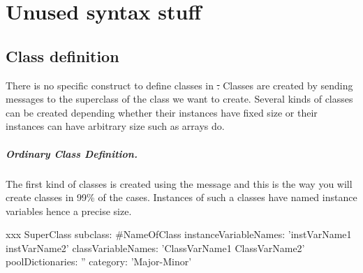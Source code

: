 \documentclass[a4paper,10pt,twoside]{book}
\begin{document}
	\renewcommand{\nnbb}[2]{} %
	\sloppy
\fi
\chapter{Unused syntax stuff}



\section{Class definition}


There is no specific construct to define classes in \st. Classes are created by sending messages to the
superclass of the class we want to create.  Several kinds of classes can be created depending whether their
instances have fixed size  or their instances can have arbitrary size such as arrays do.

\paragraph{Ordinary Class Definition.} The first kind of classes is created using the message  and this is the way you will create classes in 99\% of the cases. Instances of such a classes have named instance variables hence a precise size.

\begin{classdef}[xxx]{xxx}
SuperClass subclass: #NameOfClass
    instanceVariableNames: 'instVarName1 instVarName2'
    classVariableNames: 'ClassVarName1 ClassVarName2'
    poolDictionaries: ''
    category: 'Major-Minor'
\end{classdef}
\end{document}
